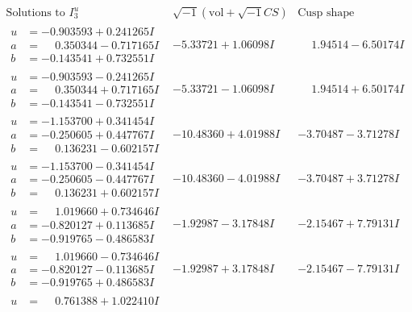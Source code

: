 \documentclass[1p]{elsarticle_modified}
\theoremstyle{definition}
\newcommand{\I}{\sqrt{-1}}
\begin{document}
$$\begin{array}{c|c|c}  
\text{Solutions to }I^u_{3}& \I (\text{vol} + \sqrt{-1}CS) & \text{Cusp shape}\\
 \hline 
\begin{aligned}
u &= -0.903593 + 0.241265 I \\
a &= \phantom{-}0.350344 - 0.717165 I \\
b &= -0.143541 + 0.732551 I\end{aligned}
 & -5.33721 + 1.06098 I & \phantom{-}1.94514 - 6.50174 I \\ \hline\begin{aligned}
u &= -0.903593 - 0.241265 I \\
a &= \phantom{-}0.350344 + 0.717165 I \\
b &= -0.143541 - 0.732551 I\end{aligned}
 & -5.33721 - 1.06098 I & \phantom{-}1.94514 + 6.50174 I \\ \hline\begin{aligned}
u &= -1.153700 + 0.341454 I \\
a &= -0.250605 + 0.447767 I \\
b &= \phantom{-}0.136231 - 0.602157 I\end{aligned}
 & -10.48360 + 4.01988 I & -3.70487 - 3.71278 I \\ \hline\begin{aligned}
u &= -1.153700 - 0.341454 I \\
a &= -0.250605 - 0.447767 I \\
b &= \phantom{-}0.136231 + 0.602157 I\end{aligned}
 & -10.48360 - 4.01988 I & -3.70487 + 3.71278 I \\ \hline\begin{aligned}
u &= \phantom{-}1.019660 + 0.734646 I \\
a &= -0.820127 + 0.113685 I \\
b &= -0.919765 - 0.486583 I\end{aligned}
 & -1.92987 - 3.17848 I & -2.15467 + 7.79131 I \\ \hline\begin{aligned}
u &= \phantom{-}1.019660 - 0.734646 I \\
a &= -0.820127 - 0.113685 I \\
b &= -0.919765 + 0.486583 I\end{aligned}
 & -1.92987 + 3.17848 I & -2.15467 - 7.79131 I \\ \hline\begin{aligned}
u &= \phantom{-}0.761388 + 1.022410 I \\

\end{aligned}
\end{array}$$
\end{document}
